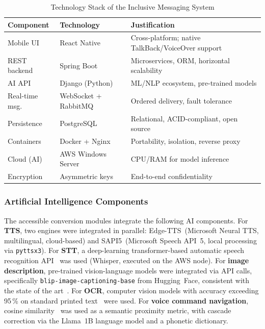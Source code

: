 \documentclass[journal]{IEEEtran}
\begin{document}
	\begin{table}[!t]
		\caption{Technology Stack of the Inclusive Messaging System}
		\label{tab:stack}
		\centering
		\scriptsize
		\renewcommand{\arraystretch}{1.25}
		\begin{tabular}{p{1.8cm}p{1.8cm}p{3.3cm}}
			\toprule
			\textbf{Component} & \textbf{Technology} & \textbf{Justification} \\
			\midrule
			Mobile UI      & React Native   & Cross-platform; native TalkBack/VoiceOver support \\
			REST backend   & Spring Boot    & Microservices, ORM, horizontal scalability \\
			AI API         & Django (Python)& ML/NLP ecosystem, pre-trained models \\
			Real-time msg. & WebSocket + RabbitMQ & Ordered delivery, fault tolerance \\
			Persistence    & PostgreSQL     & Relational, ACID-compliant, open source \\
			Containers     & Docker + Nginx & Portability, isolation, reverse proxy \\
			Cloud (AI)     & AWS Windows Server & CPU/RAM for model inference \\
			Encryption     & Asymmetric keys & End-to-end confidentiality \\
			\bottomrule
		\end{tabular}
	\end{table}
	
	\subsubsection{Artificial Intelligence Components}
	The accessible conversion modules integrate the following AI
	components.
	For \textbf{TTS}, two engines were integrated in parallel:
	Edge-TTS~(Microsoft Neural TTS, multilingual, cloud-based)
	and SAPI5~(Microsoft Speech API~5, local processing via
	\texttt{pyttsx3}).
	For \textbf{STT}, a deep-learning transformer-based automatic
	speech recognition API~\cite{baevski2020,radford2023} was used
	(Whisper, executed on the AWS node).
	For \textbf{image description}, pre-trained
	vision-language models were integrated via API calls, specifically
	\texttt{blip-image-captioning-base} from Hugging~Face,
	consistent with the state of the art~\cite{dognin2021,safiya2024}.
	For \textbf{OCR}, computer vision models with accuracy exceeding
	95\,\% on standard printed text~\cite{mukherjee2023} were used.
	For \textbf{voice command navigation}, cosine
	similarity~\cite{lahitani2016} was used as a semantic proximity
	metric, with cascade correction via the Llama~1B language model
	and a phonetic dictionary.
	
\end{document}
